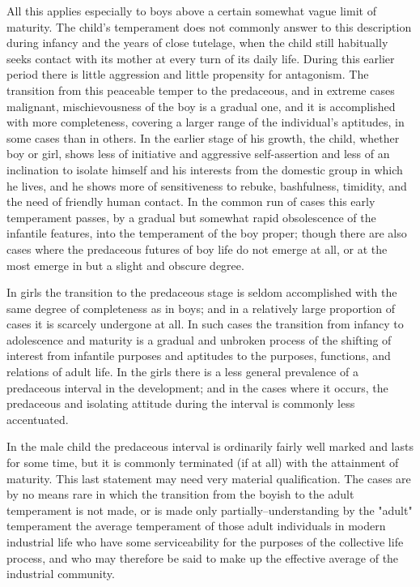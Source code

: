 \documentclass[12pt]{report}
\begin{document}
All this applies especially to boys above a certain somewhat vague limit
of maturity. The child's temperament does not commonly answer to this
description during infancy and the years of close tutelage, when the
child still habitually seeks contact with its mother at every turn of
its daily life. During this earlier period there is little aggression
and little propensity for antagonism. The transition from this
peaceable temper to the predaceous, and in extreme cases malignant,
mischievousness of the boy is a gradual one, and it is accomplished
with more completeness, covering a larger range of the individual's
aptitudes, in some cases than in others. In the earlier stage of his
growth, the child, whether boy or girl, shows less of initiative and
aggressive self-assertion and less of an inclination to isolate himself
and his interests from the domestic group in which he lives, and he
shows more of sensitiveness to rebuke, bashfulness, timidity, and the
need of friendly human contact. In the common run of cases this early
temperament passes, by a gradual but somewhat rapid obsolescence of the
infantile features, into the temperament of the boy proper; though there
are also cases where the predaceous futures of boy life do not emerge at
all, or at the most emerge in but a slight and obscure degree.

In girls the transition to the predaceous stage is seldom accomplished
with the same degree of completeness as in boys; and in a relatively
large proportion of cases it is scarcely undergone at all. In such cases
the transition from infancy to adolescence and maturity is a gradual and
unbroken process of the shifting of interest from infantile purposes and
aptitudes to the purposes, functions, and relations of adult life. In
the girls there is a less general prevalence of a predaceous interval
in the development; and in the cases where it occurs, the predaceous and
isolating attitude during the interval is commonly less accentuated.

In the male child the predaceous interval is ordinarily fairly well
marked and lasts for some time, but it is commonly terminated (if at
all) with the attainment of maturity. This last statement may need very
material qualification. The cases are by no means rare in which the
transition from the boyish to the adult temperament is not made, or
is made only partially--understanding by the "adult" temperament the
average temperament of those adult individuals in modern industrial life
who have some serviceability for the purposes of the collective life
process, and who may therefore be said to make up the effective average
of the industrial community.
\end{document}
